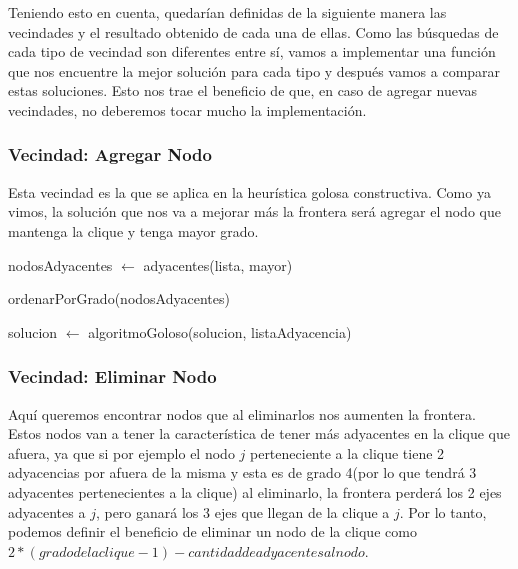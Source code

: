 Teniendo esto en cuenta, quedarían definidas de la siguiente manera las vecindades y el resultado obtenido de cada una de ellas. Como las búsquedas de cada tipo de vecindad son diferentes entre sí, vamos a implementar una función que nos encuentre la mejor solución para cada tipo y después vamos a comparar estas soluciones. Esto nos trae el beneficio de que, en caso de agregar nuevas vecindades, no deberemos tocar mucho la implementación.

\subsubsection{Vecindad: Agregar Nodo}

Esta vecindad es la que se aplica en la heurística golosa constructiva. Como ya vimos, la solución que nos va a mejorar más la frontera será agregar el nodo que mantenga la clique y tenga mayor grado.

\begin{algorithm}[H]
	\NoCaptionOfAlgo
	\caption{}

    nodosAdyacentes $\leftarrow$ adyacentes(lista, mayor)

    ordenarPorGrado(nodosAdyacentes)

    
    solucion $\leftarrow$ algoritmoGoloso(solucion, listaAdyacencia)
\end{algorithm}

\subsubsection{Vecindad: Eliminar Nodo}

Aquí queremos encontrar nodos que al eliminarlos nos aumenten la frontera. Estos nodos van a tener la característica de tener más adyacentes en la clique que afuera, ya que si por ejemplo el nodo $j$ perteneciente a la clique tiene 2 adyacencias por afuera de la misma y esta es de grado 4(por lo que tendrá 3 adyacentes pertenecientes a la clique) al eliminarlo, la frontera perderá los 2 ejes adyacentes a $j$, pero ganará los 3 ejes que llegan de la clique a $j$. Por lo tanto, podemos definir el beneficio de eliminar un nodo de la clique como $2 * (grado de la clique - 1) - cantidad de adyacentes al nodo$.

